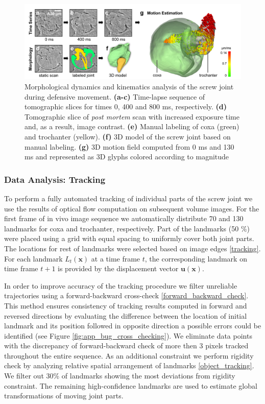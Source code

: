 \begin{figure}[ht]
  \centerline{
    \includegraphics[scale = 0.228]{figures/app_bug_motion_seg.PNG} 
  }  
  \caption{Morphological dynamics and kinematics analysis of the screw joint during defensive movement. \textbf{(a-c)} Time-lapse
sequence of tomographic slices for times 0, 400 and 800 ms, respectively. \textbf{(d)} Tomographic slice of \textit{post
mortem} scan with increased exposure time and, as a result, image contrast. \textbf{(e)} Manual labeling of coxa (green) and trochanter
(yellow). \textbf{(f)} 3D model of the screw joint based on manual labeling. \textbf{(g)} 3D motion field computed
from 0 ms and 130 ms and represented as 3D glyphs colored according to magnitude}
  \label{fig:app_bug_motion_seg}
\end{figure}

\subsubsection{Data Analysis: Tracking}

To perform a fully automated tracking of individual parts of the screw joint we use the results of optical flow computation on subsequent volume images.
For the first frame of in vivo image sequence we automatically distribute 70 and 130 landmarks for coxa and trochanter, respectively. Part of the landmarks (50 \%) were placed using a grid with equal spacing to uniformly cover both joint parts. The locations for rest of landmarks were selected based on image edges \ref{tracking}. For each landmark $L_t(\textbf{x})$ at a
time frame $t$, the corresponding landmark on time frame $t+1$ is provided by the displacement vector $\textbf{u}(\textbf{x})$. 

In order to improve accuracy of the tracking procedure we filter unreliable trajectories using a forward-backward
cross-check \ref{forward_backward_check}. This method ensures consistency of tracking results computed in forward and reversed directions by evaluating the difference between the location of initial landmark and its position followed in
opposite direction a possible errors could be identified (see Figure \ref{fig:app_bug_cross_checking}). We eliminate data points with the discrepancy of forward-backward check of more then 3 pixels tracked throughout the entire sequence. 
As an additional constraint we perform rigidity
check by analyzing relative spatial arrangement of landmarks \ref{object_tracking}. We filter out  30\% of landmarks showing the most
deviations from rigidity constraint. The remaining high-confidence landmarks  are used to estimate global transformations of moving joint parts.


